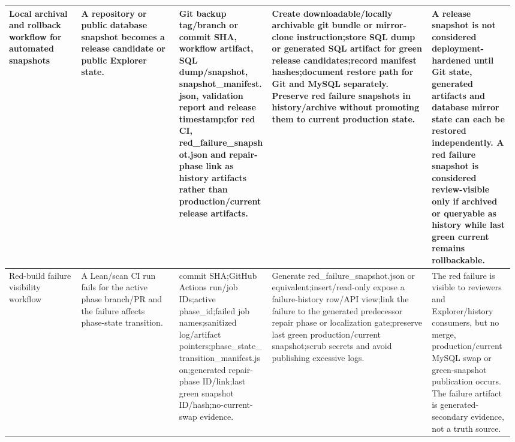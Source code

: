 \begin{longtable}{L{0.14\linewidth} L{0.19\linewidth} L{0.18\linewidth} L{0.31\linewidth} L{0.16\linewidth}}
Local archival and rollback workflow for automated snapshots & A repository or public database snapshot becomes a release candidate or public Explorer state. & Git backup tag/\allowbreak{}branch or commit SHA, workflow artifact, SQL dump/\allowbreak{}snapshot, snapshot\_manifest.json, validation report and release timestamp;\newline for red CI, red\_failure\_snapshot.json and repair-phase link as history artifacts rather than production/\allowbreak{}current release artifacts. & Create downloadable/\allowbreak{}locally archivable git bundle or mirror-clone instruction;\newline store SQL dump or generated SQL artifact for green release candidates;\newline record manifest hashes;\newline document restore path for Git and MySQL separately. Preserve red failure snapshots in history/\allowbreak{}archive without promoting them to current production state. & A release snapshot is not considered deployment-hardened until Git state, generated artifacts and database mirror state can each be restored independently. A red failure snapshot is considered review-visible only if archived or queryable as history while last green current remains rollbackable.\\
\hline
\addlinespace[0.24em]
Red-build failure visibility workflow & A Lean/\allowbreak{}scan CI run fails for the active phase branch/\allowbreak{}PR and the failure affects phase-state transition. & commit SHA;\newline GitHub Actions run/\allowbreak{}job IDs;\newline active phase\_id;\newline failed job names;\newline sanitized log/\allowbreak{}artifact pointers;\newline phase\_state\_transition\_manifest.json;\newline generated repair-phase ID/\allowbreak{}link;\newline last green snapshot ID/\allowbreak{}hash;\newline no-current-swap evidence. & Generate red\_failure\_snapshot.json or equivalent;\newline insert/\allowbreak{}read-only expose a failure-history row/\allowbreak{}API view;\newline link the failure to the generated predecessor repair phase or localization gate;\newline preserve last green production/\allowbreak{}current snapshot;\newline scrub secrets and avoid publishing excessive logs. & The red failure is visible to reviewers and Explorer/\allowbreak{}history consumers, but no merge, production/\allowbreak{}current MySQL swap or green-snapshot publication occurs. The failure artifact is generated-secondary evidence, not a truth source.\\

\end{longtable}
